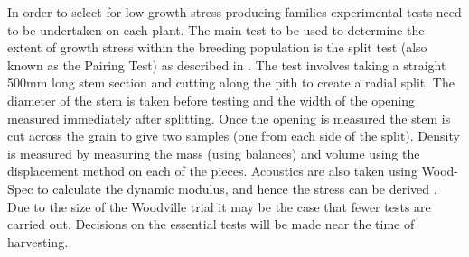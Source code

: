 In order to select for low growth stress producing families experimental tests
need to be undertaken on each plant. The main test to be used to determine the
extent of growth stress within the breeding population is the split test (also
known as the Pairing Test) as described in \citet{Chauhan_2010}. The test involves
taking a straight 500mm long stem section and cutting along the pith to create
a radial split. The diameter of the stem is taken before testing and the width
of the opening measured immediately after splitting. Once the opening is
measured the stem is cut across the grain to give two samples (one from each
side of the split). Density is measured by measuring the mass (using balances)
and volume using the displacement method on each of the pieces. Acoustics are
also taken using Wood-Spec to calculate the dynamic modulus, and hence the
stress can be derived \citep{Chauhan_2010}. Due to the size of the Woodville trial it
may be the case that fewer tests are carried out. Decisions on the essential
tests will be made near the time of harvesting. 